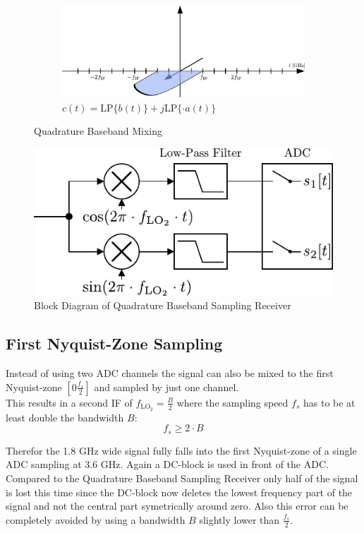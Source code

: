 \begin{figure}[h!]
\begin{subfigure}{0.45\textwidth}
    \centering
    \includegraphics[width=\textwidth]{figures/rx_adc_1_freq_c}
    \caption{$c(t) = \text{LP}\{b(t)\} + j \text{LP}\{\cdot a(t)\}$}
    \label{fig:rx_adc_1_freq_c}
  \end{subfigure}
  \caption{Quadrature Baseband Mixing}
  \label{fig:rx_adc_1_freq}
\end{figure}

\begin{figure}[h!]
  \centering
  \includegraphics[width=\textwidth]{figures/rx_adc_1_bd}
  \caption{Block Diagram of Quadrature Baseband Sampling Receiver}
  \label{fig:rx_adc_1_bd}
\end{figure}

\subsection{First Nyquist-Zone Sampling}
\label{sec:rx_adc_0}
Instead of using two \gls{ADC} channels the signal can also be mixed
to the first Nyquist-zone $[0 \frac{f_s}{2}]$ and sampled by just one
channel. \\

This results in a second \gls{IF} of $f_{\text{LO}_2} = \frac{B}{2}$ where
the sampling speed $f_s$ has to be at least double the bandwidth $B$:
\[f_s \geq 2 \cdot B\]

Therefor the 1.8 GHz wide signal fully falls into the first Nyquist-zone of
a single \gls{ADC} sampling at 3.6 GHz. Again a \acrshort{DC}-block
is used in front of the \gls{ADC}. Compared to the Quadrature Baseband
Sampling Receiver only half of the signal is lost this time since
the \acrshort{DC}-block now deletes the lowest frequency part of the signal
and not the central part symetrically around zero. Also this error
can be completely avoided by using a bandwidth $B$ slightly lower than
$\frac{f_s}{2}$. \\

